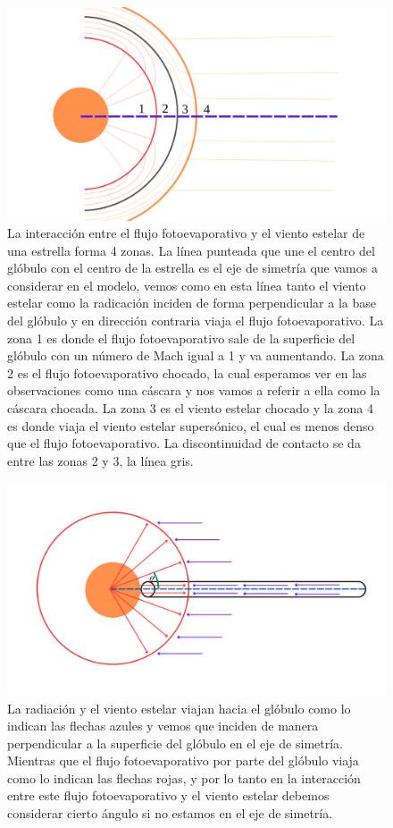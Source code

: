 \documentclass{book}
\begin{document}
\begin{figure}[htb]
    \centering    \includegraphics[width=\textwidth]{Nuevas imagenes finales/C2_zone_new.pdf}
    \caption{La interacción entre el flujo fotoevaporativo y el viento estelar de una estrella forma 4 zonas. La línea punteada que une el centro del  glóbulo con el centro de la estrella es el eje de simetría que vamos a considerar en el modelo, vemos como en esta línea tanto el viento estelar como la radicación inciden de forma perpendicular a la base del glóbulo y en dirección contraria viaja el flujo fotoevaporativo. La zona 1 es donde el flujo fotoevaporativo sale de la superficie del glóbulo con un número de Mach igual a 1 y va aumentando. La zona 2 es el flujo fotoevaporativo chocado, la cual esperamos ver en las observaciones como una cáscara y nos vamos a referir a ella como la cáscara chocada. La zona 3 es el viento estelar chocado y la zona 4 es donde viaja el viento estelar supersónico, el cual es menos denso que el flujo fotoevaporativo. La discontinuidad de contacto se da entre las zonas 2 y 3, la línea gris.}
    \label{fig:zones}
\end{figure}

\begin{figure}[h]
    \centering    \includegraphics[width=\textwidth]{artesanales/ImgFi01-2.pdf}
    \caption{La radiación y el viento estelar viajan hacia el glóbulo como lo indican las flechas azules y vemos que inciden de manera perpendicular a la superficie del glóbulo en el eje de simetría. Mientras que el flujo fotoevaporativo por parte del glóbulo viaja como lo indican las flechas rojas, y por lo tanto en la interacción entre este flujo fotoevaporativo y el viento estelar debemos considerar cierto ángulo si no estamos en el eje de simetría.}
    \label{fig:cilindross}
\end{figure}
\end{document}
